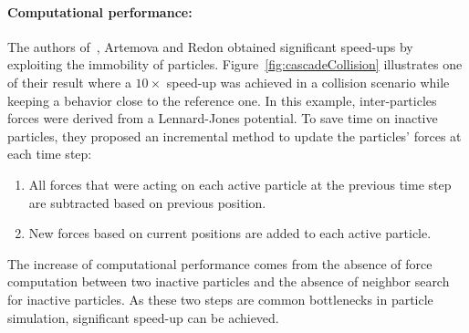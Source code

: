 \paragraph*{Computational performance:}
The authors of~\cite{Artemova2012}, Artemova and Redon obtained significant speed-ups by exploiting the immobility of particles. Figure~\ref{fig:cascadeCollision} illustrates one of their result where a $10\times$ speed-up was achieved in a collision scenario while keeping a behavior close to the reference one. In this example, inter-particles forces were derived from a Lennard-Jones potential. To save time on inactive particles, they proposed an incremental method to update the particles' forces at each time step:
\begin{enumerate}
    \item All forces that were acting on each active particle at the previous time step are subtracted based on previous position.
    \item New forces based on current positions are added to each active particle.
\end{enumerate}
The increase of computational performance comes from the absence of force computation between
two inactive particles and the absence of neighbor search for inactive particles.
As these two steps are common bottlenecks in particle simulation, significant speed-up can be achieved.

